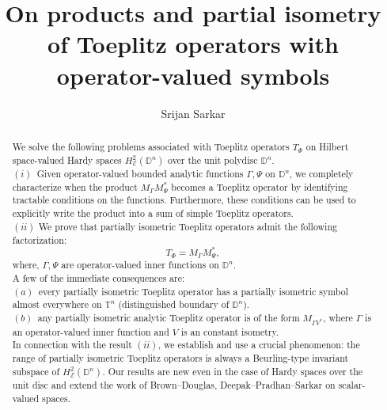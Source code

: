 \documentclass[12pt]{amsart}
\theoremstyle{definition}
\newcommand{\D}{\mathbb{D}}
\newcommand{\1}{{\mbox{\bf 1}}}
\begin{document}
\title[On product and partial isometry of Toeplitz operators]{On products and partial isometry of Toeplitz operators with operator-valued symbols}


\author[Sarkar]{Srijan Sarkar}
\address{Department of Mathematics, Indian Institute of Technology Palakkad, Kerala - 678623, India. }

\begin{abstract}
We solve the following problems associated with Toeplitz operators $T_{\Phi}$ on Hilbert space-valued Hardy spaces $H_{\mathcal{E}}^2(\mathbb{D}^n)$ over the unit polydisc $\D^n$.  \\
$(i)$~Given operator-valued bounded analytic functions $\Gamma, \Psi$ on $\mathbb{D}^n$, we completely characterize when the product $M_{\Gamma}M_{\Psi}^*$ becomes a Toeplitz operator by identifying tractable conditions on the functions. Furthermore, these conditions can be used to explicitly write the product into a sum of simple Toeplitz operators.\\
$(ii)$ We prove that partially isometric Toeplitz operators admit the following factorization:
\[
T_{\Phi} = M_{\Gamma} M_{\Psi}^*,
\]
where,  $\Gamma, \Psi$ are operator-valued inner functions on $\D^n$.  \\
A few of the immediate consequences are:\\
$(a)$~every partially isometric Toeplitz operator has a partially isometric symbol almost everywhere on $\mathbb{T}^n$ (distinguished boundary of $\mathbb{D}^n$). \\
$(b)$~any partially isometric analytic Toeplitz operator is of the form $M_{\Gamma V^*}$, where $\Gamma$ is an operator-valued inner function and $V$ is an constant isometry.\\
In connection with the result $(ii)$, we establish and use a crucial phenomenon: the range of partially isometric Toeplitz operators is always a Beurling-type invariant subspace of $H_{\mathcal{E}}^2(\mathbb{D}^n)$.  
Our results are new even in the case of Hardy spaces over the unit disc and extend the work of Brown--Douglas, Deepak--Pradhan--Sarkar on scalar-valued spaces. 
\end{abstract}

\end{document}
